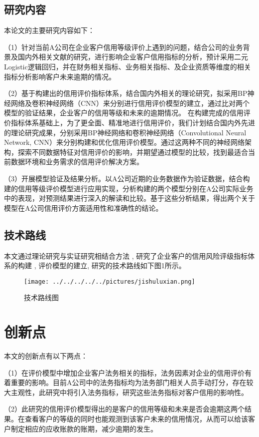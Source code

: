 \subsection{研究内容}
本论文的主要研究内容如下：

（1）针对当前A公司在企业客户信用等级评价上遇到的问题，结合公司的业务背景及国内外相关文献的研究，进行影响企业客户信用指标的分析，预计采用二元Logistic逻辑回归，并在财务相关指标、业务相关指标、及企业资质等维度的相关指标分析影响客户未来逾期的情况。

（2）基于构建出的信用评价指标体系，结合国内外相关的理论研究，拟采用BP神经网络及卷积神经网络（CNN）来分别进行信用评价模型的建立，通过比对两个模型的验证结果，企业客户的信用等级和未来的逾期情况。
在构建完成的信用评价指标体系基础上，为了更全面、精准地进行信用评价，我们计划结合国内外先进的理论研究成果，分别采用BP神经网络和卷积神经网络（Convolutional Neural Network, CNN）来分别构建和优化信用评价模型。通过这两种不同的神经网络架构，探索不同数据特征对信用评价的影响，并期望通过模型的比较，找到最适合当前数据环境和业务需求的信用评价解决方案。

（3）开展模型验证及结果分析。以A公司近期的业务数据作为验证数据，结合构建的信用等级评价模型进行应用实现，分析构建的两个模型分别在A公司实际业务中的表现，对预测结果进行深入的解读和比较。基于这些分析结果，得出两个关于模型在A公司信用评价方面适用性和准确性的结论。

\subsection{技术路线}
本文通过理论研究与实证研究相结合方法 , 研究了企业客户的信用风险评级指标体系的构建 , 评价模型的建立, 研究的技术路线如下图1所示。

\begin{figure}[!h]
	\centering
	\texttt{[image: ../../../../../pictures/jishuluxian.png]}
	\caption{技术路线图}
\end{figure}

\section{创新点}
本文的创新点有以下两点：

（1）在评价模型中增加企业客户法务相关的指标，法务因素对企业的信用评价有着重要的影响。目前A公司中的法务指标均为法务部门相关人员手动打分，存在较大主观性，此研究中将引入法务指标，研究这些法务指标对客户信用的影响性。

（2）此研究的信用评价模型得出的是客户的信用等级和未来是否会逾期这两个结果。在查看客户的等级的同时也能观测到该客户未来的信用情况，从而可以给该客户制定相应的应收账款的账期，减少逾期的发生。

